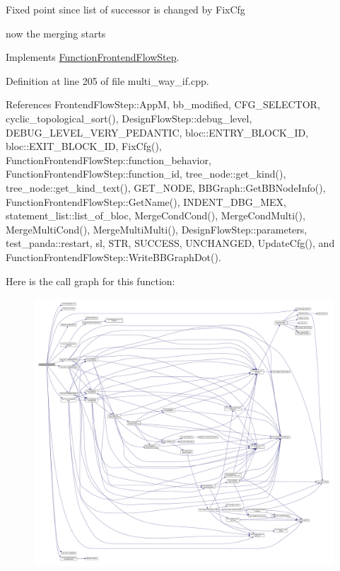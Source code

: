 Fixed point since list of successor is changed by Fix\+Cfg

now the merging starts 

Implements \hyperlink{classFunctionFrontendFlowStep_a00612f7fb9eabbbc8ee7e39d34e5ac68}{Function\+Frontend\+Flow\+Step}.



Definition at line 205 of file multi\+\_\+way\+\_\+if.\+cpp.



References Frontend\+Flow\+Step\+::\+AppM, bb\+\_\+modified, C\+F\+G\+\_\+\+S\+E\+L\+E\+C\+T\+OR, cyclic\+\_\+topological\+\_\+sort(), Design\+Flow\+Step\+::debug\+\_\+level, D\+E\+B\+U\+G\+\_\+\+L\+E\+V\+E\+L\+\_\+\+V\+E\+R\+Y\+\_\+\+P\+E\+D\+A\+N\+T\+IC, bloc\+::\+E\+N\+T\+R\+Y\+\_\+\+B\+L\+O\+C\+K\+\_\+\+ID, bloc\+::\+E\+X\+I\+T\+\_\+\+B\+L\+O\+C\+K\+\_\+\+ID, Fix\+Cfg(), Function\+Frontend\+Flow\+Step\+::function\+\_\+behavior, Function\+Frontend\+Flow\+Step\+::function\+\_\+id, tree\+\_\+node\+::get\+\_\+kind(), tree\+\_\+node\+::get\+\_\+kind\+\_\+text(), G\+E\+T\+\_\+\+N\+O\+DE, B\+B\+Graph\+::\+Get\+B\+B\+Node\+Info(), Function\+Frontend\+Flow\+Step\+::\+Get\+Name(), I\+N\+D\+E\+N\+T\+\_\+\+D\+B\+G\+\_\+\+M\+EX, statement\+\_\+list\+::list\+\_\+of\+\_\+bloc, Merge\+Cond\+Cond(), Merge\+Cond\+Multi(), Merge\+Multi\+Cond(), Merge\+Multi\+Multi(), Design\+Flow\+Step\+::parameters, test\+\_\+panda\+::restart, sl, S\+TR, S\+U\+C\+C\+E\+SS, U\+N\+C\+H\+A\+N\+G\+ED, Update\+Cfg(), and Function\+Frontend\+Flow\+Step\+::\+Write\+B\+B\+Graph\+Dot().

Here is the call graph for this function\+:
\nopagebreak
\begin{figure}[H]
\begin{center}
\leavevmode
\includegraphics[width=350pt]{dd/dca/classmulti__way__if_a48bf37aef9a799c0d3b1322e27502a0f_cgraph}
\end{center}
\end{figure}
\mbox{\label{classmulti__way__if_ae7810fa463c0f83a9a3e3b274a832582}} 
